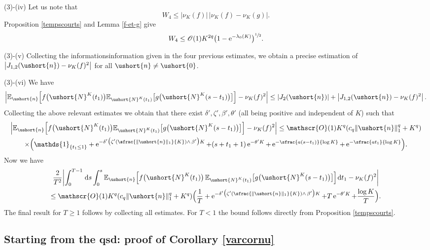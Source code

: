 \documentclass[JEP,XML,SOM,Unicode]{cedram}
\newcommand{\Psfrac}[2]{(\sfrac{#1}{#2})}
\newcommand{\scaleto}[2]{#1}
\let\mathcal\mathscr
\numberwithin{equation}{section}
\theoremstyle{plain}
\theoremstyle{definition}
\newcommand{\E}{{\mathbb{E}}}
\newcommand{\Oun}{\mathcal{O}(1)}
\newcommand{\un}{\mathds{1}}
\newcommand{\vecn}{\ushort{n}}
\newcommand{\veczer}{\ushort{0}}
\newcommand{\leproc}{\ushort{N}^{K}}
\newcommand{\sleproc}{\ushort{N}^{K}}
\newcommand{\nuk}{\nu_{K}}\let\snuk\nuk
\newcommand{\e}{\operatorname{e}}
\newcommand{\dd}{\hspace{1pt}\mathrm{d}}
\newcommand{\norm}[1]{\|#1\|_{1}}\let\snorm\norm
\begin{document}
(3)-(iv) Let us note that
\[
W_{4} \leq |\nuk(f)| \,|\nuk(f)-\nuk(g)|.
\]
Proposition \ref{tempscourts} and Lemma \ref{f-et-g} give
\[
W_{4} \leq \Oun K^{\scaleto{2q}{6pt}}\bigl(1-\e^{-\lambda_0(K)}\bigr)^{\sfrac{1}{2}}.
\]

(3)-(v) Collecting the informationsinformation given in the four previous estimates, we obtain a precise estimation
of $\left|J_{1,2}(\vecn) -\nuk(f)^2\right|$ for all $\vecn\neq \veczer$.

(3)-(vi)
We have
\[
\left|
\E_{\vecn}\Bigl[f\bigl(\leproc(t_{1})\bigr) \E_{\sleproc(t_{1}) } \bigl[g\bigl(\leproc(s-t_1)\bigr)\bigr]\Bigr]
-\nuk(f)^2
\right|
\leq |J_{2}(\vecn)| + \left|J_{1,2}(\vecn) -\nuk(f)^2
\right|.
\]
Collecting the above relevant estimates we obtain that there exist $\delta',\zeta', \beta', \theta'$ (all being positive and independent
of $K$) such that
\begin{multline*}
\left|
\E_{\vecn}\Bigl[f\bigl(\leproc(t_{1})\bigr) \E_{\sleproc(t_{1}) } \bigl[g\bigl(\leproc(s-t_1)\bigr)\bigr]\Bigr]-\nuk(f)^2
\right| \leq \Oun K^q (c_q\norm{\vecn}^{q} +K^q)\\
\times \Bigl(
\un_{\{t_1\leq 1\}}+ \e^{-\delta'\bigl(\zeta' \Psfrac{\|\vecn\|_{1}}{K}\wedge\, \beta'\bigr)K} + (s+t_1+1)\e^{-\theta' K}
+ \e^{-\sfrac{a(s-t_{1})}{\log K}} + \e^{-\sfrac{a t_{1}}{\log K}}
\Bigr).
\end{multline*}
Now we have
\begin{multline*}
\frac{\scaleto{2}{6pt}}{T^2} \biggl|\int_{0}^{T-1} \dd s\int_{0}^{s}\E_{\vecn}
\Bigl[f\bigl(\leproc(t_{1})\bigr)\, \E_{\leproc(t_{1}) } \bigl[g\bigl(\leproc(s-t_1)\bigr)\bigr]\Bigr]\dd t_{1}- \nuk(f)^2\biggr|\\
\leq \Oun K^q (c_q\norm{\vecn}^{q} +K^q)
\Bigl(
\frac{1}{T}+ \e^{-\delta'\bigl(\zeta' \Psfrac{\|\vecn\|_{1}}{K}\wedge\, \beta'\bigr)K} + T \e^{-\theta' K} + \frac{\log K}{T}
\Bigr).
\end{multline*}
The final result for $T\geq 1$ follows by collecting all estimates. For $T<1$ the bound follows directly from Proposition \ref{tempscourts}.

\subsection{Starting from the qsd: proof of Corollary \ref{varcornu}}
\end{document}
